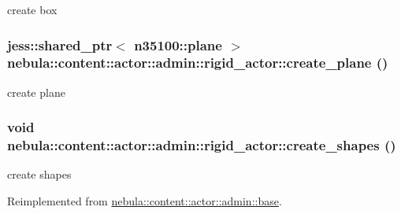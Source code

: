 create box \hypertarget{classnebula_1_1content_1_1actor_1_1admin_1_1rigid__actor_a60e98a9960bcad4ccc30d98e87dbe80c}{
\subsubsection[{create\_\-plane}]{\setlength{\rightskip}{0pt plus 5cm}jess::shared\_\-ptr$<$ {\bf n35100::plane} $>$ nebula::content::actor::admin::rigid\_\-actor::create\_\-plane ()}}
\label{classnebula_1_1content_1_1actor_1_1admin_1_1rigid__actor_a60e98a9960bcad4ccc30d98e87dbe80c}


create plane \hypertarget{classnebula_1_1content_1_1actor_1_1admin_1_1rigid__actor_a6a7daf14ba48ebe539588bfc18784267}{
\subsubsection[{create\_\-shapes}]{\setlength{\rightskip}{0pt plus 5cm}void nebula::content::actor::admin::rigid\_\-actor::create\_\-shapes ()}}
\label{classnebula_1_1content_1_1actor_1_1admin_1_1rigid__actor_a6a7daf14ba48ebe539588bfc18784267}


create shapes 

Reimplemented from \hyperlink{classnebula_1_1content_1_1actor_1_1admin_1_1base_a0b3740d9da779fe2817e0d64ac733cdf}{nebula::content::actor::admin::base}.

